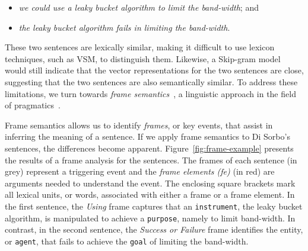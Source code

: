 \begin{itemize}
\item  \textit{we could use a leaky bucket algorithm to limit the band-width}; and
\item \textit{the leaky bucket algorithm fails in limiting the band-width}.
\end{itemize}

These two sentences are lexically similar, making it
difficult to use lexicon techniques, such as \acs{VSM}, to distinguish them. Likewise, a Skip-gram model would still indicate that the vector representations for the two sentences are close, suggesting that the two sentences are also semantically similar. 
To address these limitations, we turn towards \textit{frame
semantics}~\cite{fillmore1976frame, Baker1998}, a 
linguistic approach in the field of pragmatics~\cite{ariel2008pragmatics, austin1975pragmatics}.



Frame semantics allows us to identify \textit{frames},
or key events, that assist in inferring the meaning of a sentence.
If we apply frame semantics to Di Sorbo's sentences, the differences become apparent.
Figure~\ref{fig:frame-example} presents the results of a frame
analysis for the sentences.
The frames of each sentence (in grey) represent a
triggering event and the \textit{frame elements (fe)} (in red) are arguments needed
to understand the event. The enclosing square brackets
mark all lexical units, or words,
associated with either a frame or a frame element.
In the first sentence, the \textit{Using} frame
captures that an \texttt{instrument}, the leaky bucket algorithm, is
manipulated to achieve a \texttt{purpose}, namely to limit band-width.
In contrast, in the second sentence, the \textit{Success or Failure}
frame identifies the entity, or \texttt{agent}, that fails to achieve the \texttt{goal} of limiting the band-width. 









